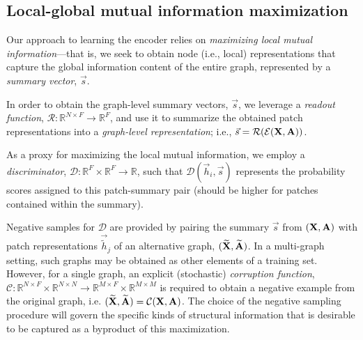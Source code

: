 \documentclass{article} \usepackage{iclr2019_conference,times}
\begin{document}
\subsection{Local-global mutual information maximization}

Our approach to learning the encoder relies on \emph{maximizing local mutual information}---that is, we seek to obtain node (i.e., local) representations that capture the global information content of the entire graph, represented by a \emph{summary vector}, $\vec{s}$. 

In order to obtain the graph-level summary vectors, $\vec{s}$, we leverage a \emph{readout function}, $\mathcal{R} : \mathbb{R}^{N\times F} \rightarrow \mathbb{R}^F$, and use it to summarize the obtained patch representations into a \emph{graph-level representation}; i.e., $\vec{s} = \mathcal{R}(\mathcal{E}({\bf X}, {\bf A}))$.

As a proxy for maximizing the local mutual information, we employ a \emph{discriminator}, $\mathcal{D} : \mathbb{R}^F \times \mathbb{R}^F \rightarrow \mathbb{R}$, such that $\mathcal{D}(\vec{h}_i, \vec{s})$ represents the probability scores assigned to this patch-summary pair (should be higher for patches contained within the summary).

Negative samples for $\mathcal{D}$ are provided by pairing the summary $\vec{s}$ from $({\bf X}, {\bf A})$ with patch representations $\vec{\widetilde{h}}_j$ of an alternative graph, $({\bf \widetilde{X}}, {\bf \widetilde{A}})$. In a multi-graph setting, such graphs may be obtained as other elements of a training set. However, for a single graph, an explicit (stochastic) \emph{corruption function}, $\mathcal{C} : \mathbb{R}^{N\times F} \times \mathbb{R}^{N \times N} \rightarrow \mathbb{R}^{M\times F} \times \mathbb{R}^{M\times M}$ is required to obtain a negative example from the original graph, i.e. $({\bf \widetilde{X}}, {\bf \widetilde{A}}) = \mathcal{C}({\bf X}, {\bf A})$. The choice of the negative sampling procedure will govern the specific kinds of structural information that is desirable to be captured as a byproduct of this maximization.
\end{document}

